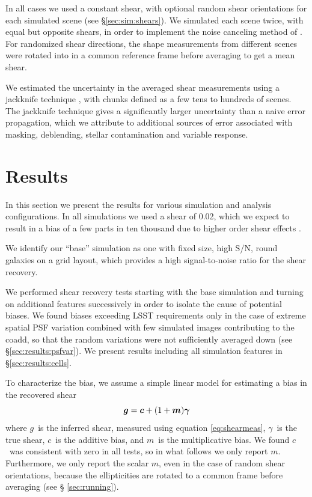 \documentclass[twocolumn,twocolappendix,astrosym]{openjournal}
\newcommand{\vecg}{\mbox{\boldmath $g$}}
\newcommand{\vecc}{\mbox{\boldmath $c$}}
\newcommand{\vecm}{\mbox{\boldmath $m$}}
\newcommand{\vecgam}{\mbox{\boldmath $\gamma$}}
\newcommand{\mshear}{0.02}
\begin{document}
In all cases we used a constant shear, with optional random shear orientations
for each simulated scene (see \S \ref{sec:sim:shears}).  We simulated each
scene twice, with equal but opposite shears, in order to implement the noise
canceling method of \cite{pujol2019}.  For randomized shear directions, the
shape measurements from different scenes were rotated into in a common reference
frame before averaging to get a mean shear.

We estimated the uncertainty in the averaged shear measurements using a
jackknife technique \citep{LuptonStats1993}, with chunks defined as a few tens
to hundreds of scenes.  The jackknife technique gives a significantly larger
uncertainty than a naive error propagation, which we attribute to additional
sources of error associated with masking, deblending, stellar contamination and
variable response.

\section{Results} \label{sec:results}

In this section we present the results for various simulation and analysis
configurations.  In all simulations we used a shear of \mshear, which we expect
to result in a bias of a few parts in ten thousand due to higher order
shear effects \citep{SheldonMcal2017,mdet20}.

We identify our ``base'' simulation as one with fixed size, high S/N, round
galaxies on a grid layout, which provides a high signal-to-noise ratio for the
shear recovery.

We performed shear recovery tests starting with the base simulation and turning
on additional features successively in order to isolate the cause of potential
biases.  We found biases exceeding LSST requirements only in the case of
extreme spatial PSF variation combined with few simulated images contributing
to the coadd, so that the random variations were not sufficiently averaged down
(see \S \ref{sec:results:psfvar}).  We present results including all simulation
features in \S \ref{sec:results:cells}.

To characterize the bias, we assume a simple linear model \citep[see,
e.g.,][]{heymans2006} for estimating a bias in the recovered shear
\begin{equation} \label{eq:m}
\vecg = \vecc + (1 + \vecm) \vecgam
\end{equation}
where \vecg\ is the inferred shear, measured using equation \ref{eq:shearmeas},
\vecgam\ is the true shear, \vecc\ is the additive bias, and \vecm\ is the
multiplicative bias. We found \vecc\ was consistent with zero in all tests, so
in what follows we only report \vecm.  Furthermore, we only report
the scalar $m$, even in the case of random shear orientations, because
the ellipticities are rotated to a common frame before averaging (see \S
\ref{sec:running}).
\end{document}
